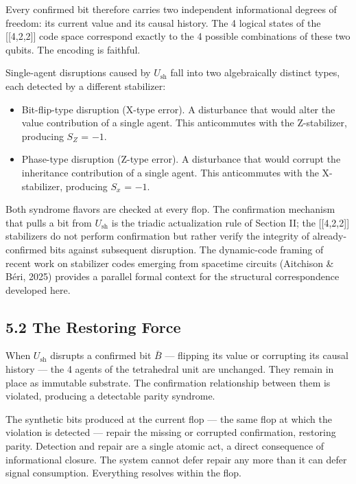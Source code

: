 \documentclass[11pt,oneside]{report}
\theoremstyle{definition}
\theoremstyle{remark}
\begin{document}
Every confirmed bit therefore carries two independent informational
degrees of freedom: its current value and its causal history. The 4
logical states of the [[4,2,2]] code space correspond exactly to
the 4 possible combinations of these two qubits. The encoding is
faithful.

Single-agent disruptions caused by \ensuremath{U_{\mathrm{sh}}} fall into two algebraically
distinct types, each detected by a different stabilizer:

\begin{itemize}
\item
  Bit-flip-type disruption (X-type error). A disturbance that would
  alter the value contribution of a single agent. This anticommutes with
  the Z-stabilizer, producing \ensuremath{S_{Z}} = \ensuremath{-1.}
\item
  Phase-type disruption (Z-type error). A disturbance that would corrupt
  the inheritance contribution of a single agent. This anticommutes with
  the X-stabilizer, producing \ensuremath{S_{x}} = \ensuremath{-1.}
\end{itemize}

Both syndrome flavors are checked at every flop. The confirmation
mechanism that pulls a bit from \ensuremath{U_{\mathrm{sh}}} is the triadic actualization rule of
Section II; the [[4,2,2]] stabilizers do not perform
confirmation but rather verify the integrity of already-confirmed bits
against subsequent disruption. The dynamic-code framing of recent work
on stabilizer codes emerging from spacetime circuits (Aitchison \& Béri,
2025) provides a parallel formal context for the structural
correspondence developed here.

\subsection*{5.2 The Restoring Force}

When \ensuremath{U_{\mathrm{sh}}} disrupts a confirmed bit \ensuremath{\bar{B}} --- flipping its value or corrupting
its causal history --- the 4 agents of the tetrahedral unit are
unchanged. They remain in place as immutable substrate. The confirmation
relationship between them is violated, producing a detectable parity
syndrome.

The synthetic bits produced at the current flop --- the same flop at
which the violation is detected --- repair the missing or corrupted
confirmation, restoring parity. Detection and repair are a single atomic
act, a direct consequence of informational closure. The system cannot
defer repair any more than it can defer signal consumption. Everything
resolves within the flop.
\end{document}
